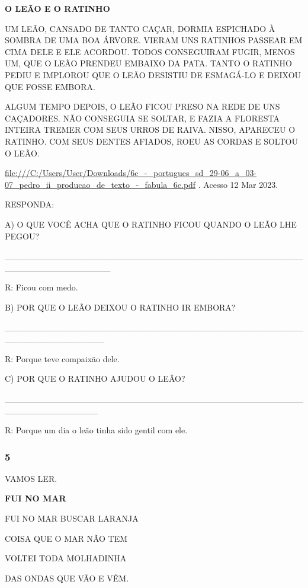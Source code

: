 \textbf{O LEÃO E O RATINHO}

UM LEÃO, CANSADO DE TANTO CAÇAR, DORMIA ESPICHADO À SOMBRA DE UMA BOA
ÁRVORE. VIERAM UNS RATINHOS PASSEAR EM CIMA DELE E ELE ACORDOU. TODOS
CONSEGUIRAM FUGIR, MENOS UM, QUE O LEÃO PRENDEU EMBAIXO DA PATA. TANTO O
RATINHO PEDIU E IMPLOROU QUE O LEÃO DESISTIU DE ESMAGÁ-LO E DEIXOU QUE
FOSSE EMBORA.

ALGUM TEMPO DEPOIS, O LEÃO FICOU PRESO NA REDE DE UNS CAÇADORES. NÃO
CONSEGUIA SE SOLTAR, E FAZIA A FLORESTA INTEIRA TREMER COM SEUS URROS DE
RAIVA. NISSO, APARECEU O RATINHO. COM SEUS DENTES AFIADOS, ROEU AS
CORDAS E SOLTOU O LEÃO.

\url{file:///C:/Users/User/Downloads/6c_-_portugues_sd_29-06_a_03-07_pedro_ii_producao_de_texto_-_fabula_6c.pdf}
. Acesso 12 Mar 2023.

RESPONDA:

A) O QUE VOCÊ ACHA QUE O RATINHO FICOU QUANDO O LEÃO LHE PEGOU?

\_\_\_\_\_\_\_\_\_\_\_\_\_\_\_\_\_\_\_\_\_\_\_\_\_\_\_\_\_\_\_\_\_\_\_\_\_\_\_\_\_\_\_\_\_\_\_\_\_\_\_\_\_\_\_\_\_\_\_\_\_\_\_\_\_

R: Ficou com medo.

B) POR QUE O LEÃO DEIXOU O RATINHO IR EMBORA?

\_\_\_\_\_\_\_\_\_\_\_\_\_\_\_\_\_\_\_\_\_\_\_\_\_\_\_\_\_\_\_\_\_\_\_\_\_\_\_\_\_\_\_\_\_\_\_\_\_\_\_\_\_\_\_\_\_\_\_\_\_\_\_\_

R: Porque teve compaixão dele.

C) POR QUE O RATINHO AJUDOU O LEÂO?

\_\_\_\_\_\_\_\_\_\_\_\_\_\_\_\_\_\_\_\_\_\_\_\_\_\_\_\_\_\_\_\_\_\_\_\_\_\_\_\_\_\_\_\_\_\_\_\_\_\_\_\_\_\_\_\_\_\_\_\_\_\_\_

R: Porque um dia o leão tinha sido gentil com ele.

\protect\hypertarget{_heading=h.cx2waide4olu}{}{}

\subsubsection{5 }\label{section-72}

VAMOS LER.

\textbf{FUI NO MAR}

FUI NO MAR BUSCAR LARANJA

COISA QUE O MAR NÃO TEM

VOLTEI TODA MOLHADINHA

DAS ONDAS QUE VÃO E VÊM.

